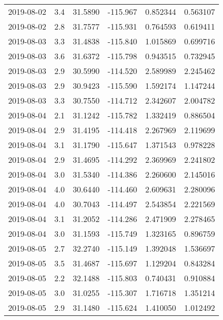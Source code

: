 \begin{tabular}{lrrrrr}
2019-08-02 &       3.4 &  31.5890 &  -115.967 &         0.852344 &         0.563107 \\
2019-08-02 &       2.8 &  31.7577 &  -115.931 &         0.764593 &         0.619411 \\
2019-08-03 &       3.3 &  31.4838 &  -115.840 &         1.015869 &         0.699716 \\
2019-08-03 &       3.6 &  31.6372 &  -115.798 &         0.943515 &         0.732945 \\
2019-08-03 &       2.9 &  30.5990 &  -114.520 &         2.589989 &         2.245462 \\
2019-08-03 &       2.9 &  30.9423 &  -115.590 &         1.592174 &         1.147244 \\
2019-08-03 &       3.3 &  30.7550 &  -114.712 &         2.342607 &         2.004782 \\
2019-08-04 &       2.1 &  31.1242 &  -115.782 &         1.332419 &         0.886504 \\
2019-08-04 &       2.9 &  31.4195 &  -114.418 &         2.267969 &         2.119699 \\
2019-08-04 &       3.1 &  31.1790 &  -115.647 &         1.371543 &         0.978228 \\
2019-08-04 &       2.9 &  31.4695 &  -114.292 &         2.369969 &         2.241802 \\
2019-08-04 &       3.0 &  31.5340 &  -114.386 &         2.260600 &         2.145016 \\
2019-08-04 &       4.0 &  30.6440 &  -114.460 &         2.609631 &         2.280096 \\
2019-08-04 &       4.0 &  30.7043 &  -114.497 &         2.543854 &         2.221569 \\
2019-08-04 &       3.1 &  31.2052 &  -114.286 &         2.471909 &         2.278465 \\
2019-08-04 &       3.0 &  31.1593 &  -115.749 &         1.323165 &         0.896759 \\
2019-08-05 &       2.7 &  32.2740 &  -115.149 &         1.392048 &         1.536697 \\
2019-08-05 &       3.5 &  31.4687 &  -115.697 &         1.129204 &         0.843284 \\
2019-08-05 &       2.2 &  32.1488 &  -115.803 &         0.740431 &         0.910884 \\
2019-08-05 &       3.0 &  31.0255 &  -115.307 &         1.716718 &         1.351214 \\
2019-08-05 &       2.9 &  31.1480 &  -115.624 &         1.410050 &         1.012492 \\

\end{tabular}
